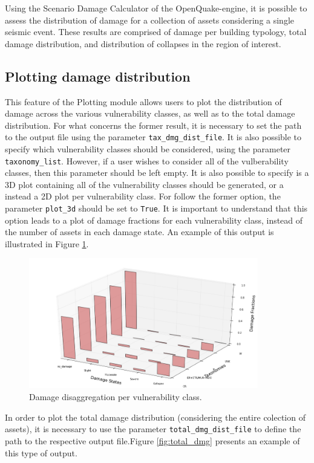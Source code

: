 Using the Scenario Damage Calculator \citep{SilvaEtAl2014a} of the OpenQuake-engine, it is possible to assess the distribution of damage for a collection of assets considering a single seismic event. These results are comprised of damage per building typology, total damage distribution, and distribution of collapses in the region of interest.

\subsection{Plotting damage distribution}
\label{subsec:plot-damage_disag}
This feature of the Plotting module allows users to plot the distribution of damage across the various vulnerability classes, as well as to the total damage distribution. For what concerns the former result, it is necessary to set the path to the output file using the parameter \verb=tax_dmg_dist_file=. It is also possible to specify which vulnerability classes should be considered, using the parameter \verb=taxonomy_list=. However, if a user wishes to consider all of the vulberability classes, then this parameter should be left empty. It is also possible to specify is a 3D plot containing all of the vulnerability classes should be generated, or a instead a 2D plot per vulnerability class. For follow the former option, the parameter \verb=plot_3d= should be set to \verb=True=. It is important to understand that this option leads to a plot of damage fractions for each vulnerability class, instead of the number of assets in each damage state. An example of this output is illustrated in Figure \ref{fig:damage_disag}.

\begin{figure}[htb]
  \centering
      \includegraphics[width=10cm]{Figures/damage_distribution.png}
  \caption{Damage disaggregation per vulnerability class.}
  \label{fig:damage_disag}
\end{figure}

In order to plot the total damage distribution (considering the entire colection of assets), it is necessary to use the parameter \verb=total_dmg_dist_file= to define the path to the respective output file.Figure \ref{fig:total_dmg} presents an example of this type of output.

